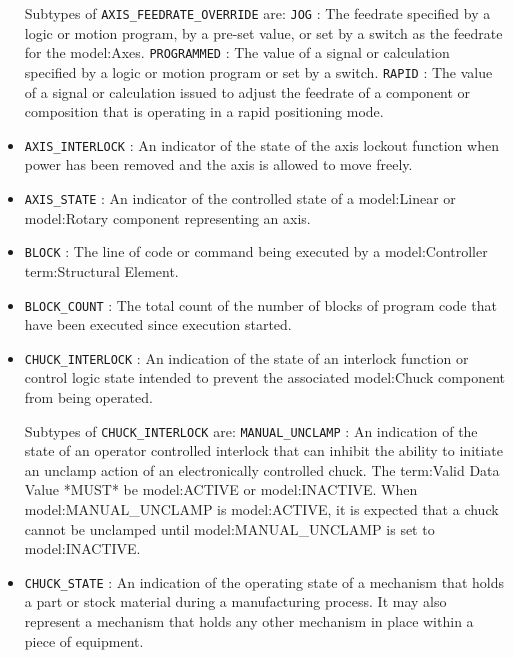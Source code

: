 \begin{itemize}
Subtypes of \texttt{AXIS_FEEDRATE_OVERRIDE} are: 
\newline\tab \texttt{JOG} : The feedrate specified by a logic or motion program, by a pre-set value, or set by a switch as the feedrate for the {model:Axes}.  
\newline\tab \texttt{PROGRAMMED} : The value of a signal or calculation specified by a logic or motion program or set by a switch. 
\newline\tab \texttt{RAPID} : The value of a signal or calculation issued to adjust the feedrate of a component or composition that is operating in a rapid positioning mode. 
\item \texttt{AXIS_INTERLOCK} : An indicator of the state of the axis lockout function when power has been removed and the axis is allowed to move freely. 

\item \texttt{AXIS_STATE} : An indicator of the controlled state of a {model:Linear} or {model:Rotary} component representing an axis. 

\item \texttt{BLOCK} : The line of code or command being executed by a {model:Controller} {term:Structural Element}. 

\item \texttt{BLOCK_COUNT} : The total count of the number of blocks of program code that have been executed since execution started. 

\item \texttt{CHUCK_INTERLOCK} : An indication of the state of an interlock function or control logic state intended to prevent the associated {model:Chuck} component from being operated. 

Subtypes of \texttt{CHUCK_INTERLOCK} are: 
\newline\tab \texttt{MANUAL_UNCLAMP} : An indication of the state of an operator controlled interlock that can inhibit the ability to initiate an unclamp action of an electronically controlled chuck.
 The {term:Valid Data Value} *MUST* be {model:ACTIVE} or {model:INACTIVE}. 
 When {model:MANUAL_UNCLAMP} is {model:ACTIVE}, it is expected that a chuck cannot be unclamped until {model:MANUAL_UNCLAMP} is set to {model:INACTIVE}.  
\item \texttt{CHUCK_STATE} : An indication of the operating state of a mechanism that holds a part or stock material during a manufacturing process. It may also represent a mechanism that holds any other mechanism in place within a piece of equipment. 


\end{itemize}
